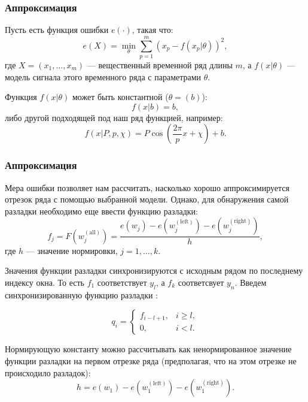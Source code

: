 \documentclass[intlimits, 9pt, unicode]{beamer}
\begin{document}
\begin{frame}
    \frametitle{Аппроксимация}

Пусть есть функция ошибки $e(\cdot)$, такая что:
\begin{equation*}
e(X) = \min_{\theta}{\sum_{p=1}^m(x_p - f(x_p | \theta))^2 },
\end{equation*}
где $X = (x_1, \dots, x_m)$ ---  вещественный временной ряд длины $m$, а $f(x | \theta)$ --- модель сигнала этого временного ряда с параметрами $\theta$.

Функция $f(x|\theta)$ может быть константной ($\theta = (b)$):
\begin{equation*}
f(x | b) = b,
\end{equation*}
либо другой подходящей под наш ряд функцией, например:
\begin{equation*}
f(x | P, p, \chi) = P\cos(\frac{2\pi}{p}x + \chi) + b. 
\end{equation*}

\end{frame}

\begin{frame}
    \frametitle{Аппроксимация}

Мера ошибки позволяет нам рассчитать, насколько хорошо аппроксимируется отрезок ряда с помощью выбранной модели. Однако, для обнаружения самой разладки необходимо еще ввести функцию разладки:
\begin{equation*}
f_j = F(w_j^{\mathrm{(all)}} ) = \frac{e(w_j) - e(w_j^{\mathrm{(left)}}) - e(w_j^{\mathrm{(right)}})}{h}, 
\end{equation*}
где $h$ --- значение нормировки, $j = 1, \dots, k$.

Значения функции разладки синхронизируются с исходным рядом по последнему индексу окна. То есть $f_1$ соответствует $y_l$, а $f_k $ соответсвует $y_n$. Введем синхронизированную функцию разладки :

\begin{equation*}
q_i =
	\begin{cases}
		f_{i-l+1}, & i \geq l, \\
		0, & i < l.
	\end{cases}
\end{equation*}

Нормирующую константу можно рассчитывать как ненормированное значение функции разладки на первом отрезке ряда (предполагая, что на этом отрезке не происходило разладок):
\begin{equation*} 
h = e(w_1) - e(w_1^{\mathrm{(left)}}) - e(w_1^{\mathrm{(right)}}). 
\end{equation*}


\end{frame}
\end{document}
